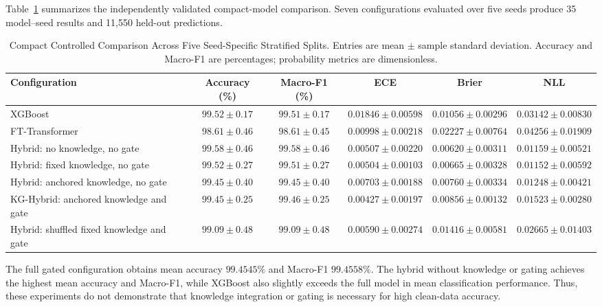 Table~\ref{tab:compact_comparison} summarizes the independently
validated compact-model comparison. Seven configurations evaluated
over five seeds produce 35 model--seed results and 11,550 held-out
predictions.

\begin{table}[t]
\centering
\caption{Compact Controlled Comparison Across Five Seed-Specific
Stratified Splits. Entries are mean $\pm$ sample standard deviation.
Accuracy and Macro-F1 are percentages; probability metrics are
dimensionless.}
\label{tab:compact_comparison}
\footnotesize
\setlength{\tabcolsep}{5pt}
\begin{tabular}{lccccc}
\hline
Configuration
& Accuracy (\%)
& Macro-F1 (\%)
& ECE
& Brier
& NLL \\
\hline
XGBoost
& $99.52\pm0.17$
& $99.51\pm0.17$
& $0.01846\pm0.00598$
& $0.01056\pm0.00296$
& $0.03142\pm0.00830$ \\

FT-Transformer
& $98.61\pm0.46$
& $98.61\pm0.45$
& $0.00998\pm0.00218$
& $0.02227\pm0.00764$
& $0.04256\pm0.01909$ \\

Hybrid: no knowledge, no gate
& $99.58\pm0.46$
& $99.58\pm0.46$
& $0.00507\pm0.00220$
& $0.00620\pm0.00311$
& $0.01159\pm0.00521$ \\

Hybrid: fixed knowledge, no gate
& $99.52\pm0.27$
& $99.51\pm0.27$
& $0.00504\pm0.00103$
& $0.00665\pm0.00328$
& $0.01152\pm0.00592$ \\

Hybrid: anchored knowledge, no gate
& $99.45\pm0.40$
& $99.45\pm0.40$
& $0.00703\pm0.00188$
& $0.00760\pm0.00334$
& $0.01248\pm0.00421$ \\

KG-Hybrid: anchored knowledge and gate
& $99.45\pm0.25$
& $99.46\pm0.25$
& $0.00427\pm0.00197$
& $0.00856\pm0.00132$
& $0.01523\pm0.00280$ \\

Hybrid: shuffled fixed knowledge and gate
& $99.09\pm0.48$
& $99.09\pm0.48$
& $0.00590\pm0.00274$
& $0.01416\pm0.00581$
& $0.02665\pm0.01403$ \\
\hline
\end{tabular}
\end{table}

The full gated configuration obtains mean accuracy
$99.4545\%$ and Macro-F1 $99.4558\%$.
The hybrid without knowledge or gating achieves the highest mean
accuracy and Macro-F1, while XGBoost also slightly exceeds the full
model in mean classification performance. Thus, these experiments
do not demonstrate that knowledge integration or gating is necessary
for high clean-data accuracy.

